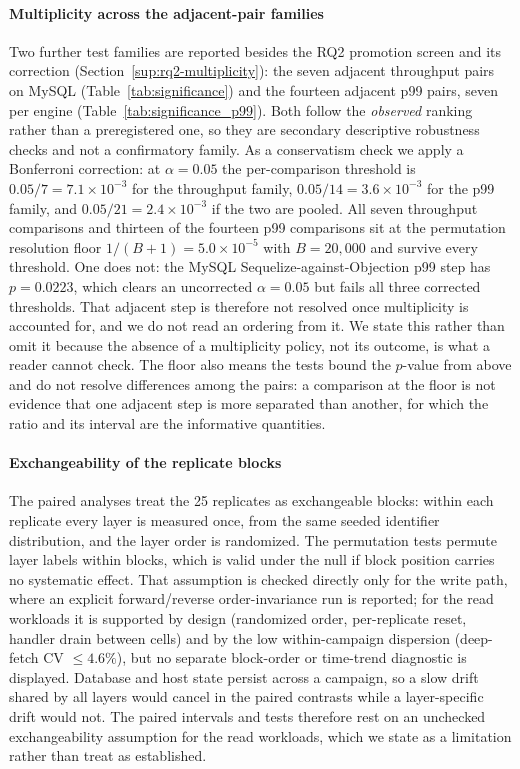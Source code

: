 \documentclass[11pt,a4paper]{article}
\begin{document}
\paragraph{Multiplicity across the adjacent-pair families}
Two further test families are reported besides the RQ2 promotion screen and its correction
(Section~\ref{sup:rq2-multiplicity}): the seven adjacent throughput
pairs on MySQL (Table~\ref{tab:significance}) and the fourteen adjacent p99 pairs, seven per
engine (Table~\ref{tab:significance_p99}). Both follow the \emph{observed} ranking rather than a
preregistered one, so they are secondary descriptive robustness checks and not a confirmatory
family. As a conservatism check we apply a Bonferroni correction: at $\alpha=0.05$ the
per-comparison threshold is $0.05/7=7.1\times10^{-3}$ for the throughput family,
$0.05/14=3.6\times10^{-3}$ for the p99 family, and $0.05/21=2.4\times10^{-3}$ if the two are
pooled. All seven throughput comparisons and thirteen of the fourteen p99 comparisons sit at the
permutation resolution floor $1/(B{+}1)=5.0\times10^{-5}$ with $B=20{,}000$ and survive every
threshold. One does not: the MySQL Sequelize-against-Objection p99 step has $p=0.0223$, which
clears an uncorrected $\alpha=0.05$ but fails all three corrected thresholds. That adjacent step
is therefore not resolved once multiplicity is accounted for, and we do not read an ordering from
it. We state this rather than omit it because the
absence of a multiplicity policy, not its outcome, is what a reader cannot check. The floor also
means the tests bound the $p$-value from above and do not resolve differences among the pairs:
a comparison at the floor is not evidence that one adjacent step is more separated than another,
for which the ratio and its interval are the informative quantities.

\paragraph{Exchangeability of the replicate blocks}
The paired analyses treat the 25 replicates as exchangeable blocks: within each replicate every
layer is measured once, from the same seeded identifier distribution, and the layer order is
randomized. The permutation tests permute layer labels within blocks, which is valid under the null
if block position carries no systematic effect. That assumption is checked directly only for the
write path, where an explicit forward/reverse order-invariance run is reported; for the read
workloads it is supported by design (randomized order, per-replicate reset, handler drain between
cells) and by the low within-campaign dispersion (deep-fetch CV $\leq4.6\%$), but no separate
block-order or time-trend diagnostic is displayed. Database and host state persist across a
campaign, so a slow drift shared by all layers would cancel in the paired contrasts while a
layer-specific drift would not. The paired intervals and tests therefore rest on an unchecked
exchangeability assumption for the read workloads, which we state as a limitation rather than
treat as established.
\end{document}

